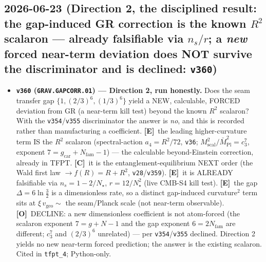 \documentclass[11pt]{article}
\providecommand{\mE}{\textbf{[E]}}\providecommand{\mC}{\textbf{[C]}}
\providecommand{\mO}{\textbf{[O]}}\providecommand{\mX}{\textbf{[X]}}
\providecommand{\vref}[1]{\texttt{#1}}
\providecommand{\cthree}{c_3}\providecommand{\phiz}{\varphi_0^{\mathrm{ret}}}
\providecommand{\gcar}{g_{\mathrm{car}}}\providecommand{\Nfam}{N_{\mathrm{fam}}}
\providecommand{\Mbar}{\bar M_{\mathrm{Pl}}}\providecommand{\Z}{\mathbb{Z}}\providecommand{\PP}{\mathbb{P}}
\begin{document}
\subsection*{2026-06-23 (Direction 2, the disciplined result: the gap-induced GR correction is the known $R^2$ scalaron --- already falsifiable via $n_s/r$; a \emph{new} forced near-term deviation does NOT survive the discriminator and is declined: \texttt{v360})}
\begin{itemize}
\item \textbf{\texttt{v360} (\texttt{GRAV.GAPCORR.01}) --- Direction 2, run honestly.} Does the seam transfer gap
$\{1,(2/3)^6,(1/3)^6\}$ yield a NEW, calculable, FORCED deviation from GR (a near-term kill test) beyond the known
$R^2$ scalaron? With the \vref{v354}/\vref{v355} discriminator the answer is \emph{no}, and this is recorded rather
than manufacturing a coefficient. \mE\ the leading higher-curvature term IS the $R^2$ scalaron (spectral-action
$a_4{=}R^2/72$, \vref{v36}; $M_{\mathrm{scal}}^2/\Mbar^2=\cthree^7$, exponent $7{=}\gcar{+}\Nfam{-}1$) --- the
calculable beyond-Einstein correction, already in TFPT. \mC\ it is the entanglement-equilibrium NEXT order (the Wald
first law $\to f(R){=}R{+}R^2$, \vref{v28}/\vref{v359}). \mE\ it is ALREADY falsifiable via $n_s{=}1{-}2/N_\star$,
$r{=}12/N_\star^2$ (live CMB-S4 kill test). \mE\ the gap $\Delta{=}6\ln\tfrac32$ is a dimensionless rate, so a
distinct gap-induced curvature$^2$ term sits at $\xi\,v_{\mathrm{geo}}\sim$ the seam/Planck scale (not near-term
observable). \mO\ DECLINE: a new dimensionless coefficient is not atom-forced (the scalaron exponent $7{=}g{+}N{-}1$
and the gap exponent $6{=}2\Nfam$ are different; $\cthree^7$ and $(2/3)^6$ unrelated) --- per \vref{v354}/\vref{v355}
declined. Direction 2 yields no new near-term forced prediction; the answer is the existing scalaron. Cited in
\texttt{tfpt\_4}; Python-only.
\end{itemize}
\end{document}
